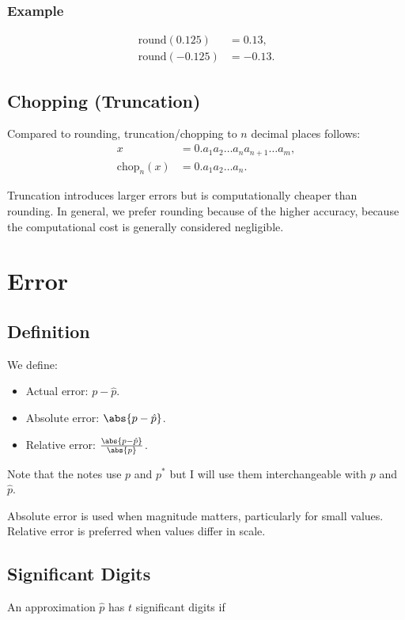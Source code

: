 \subsubsection{Example}
\begin{align*}
    \text{round}(0.125) &= 0.13, \\
    \text{round}(-0.125) &= -0.13.
\end{align*}

\subsection{Chopping (Truncation)}
Compared to rounding, truncation/chopping to $n$ decimal places follows:
\begin{align*}
  x &= 0.a_1 a_2 \dots a_na_{n+1} \dots a_m, \\
  \text{chop}_n(x) &= 0.a_1 a_2 \dots a_n.
\end{align*}

Truncation introduces larger errors but is computationally cheaper than 
rounding. In general, we prefer rounding because of the higher accuracy, because
the computational cost is generally considered negligible.

\section{Error}

\subsection{Definition}

We define:
\begin{itemize}
  \item Actual error: $p - \hat{p}$.
    \item Absolute error: $\abs{p - \hat{p}}$.
    \item Relative error: $\frac{\abs{p - \hat{p}}}{\abs{p}}$.
\end{itemize}
\tiny Note that the notes use $p$ and $p^*$ but I will use them interchangeable with
$p$ and $\hat{p}$.

\normalsize
Absolute error is used when magnitude matters, particularly for small values. 
Relative error is preferred when values differ in scale.

\subsection{Significant Digits}
An approximation $\hat p$ has $t$ significant digits if

